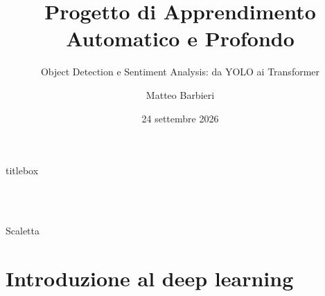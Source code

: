 \documentclass[aspectratio=169]{beamer}
\title[Progetto DL]{Progetto di Apprendimento Automatico e Profondo}
\subtitle{Object Detection e Sentiment Analysis: da YOLO ai Transformer}
\author{Matteo Barbieri}
\institute[Apprendimento Profondo]{Apprendimento Profondo}
\date{24 settembre 2026}
\begin{document}

\begin{frame}[plain]
  \vfill
  \begin{center}
    \begin{beamercolorbox}[rounded=true, shadow=true, wd=0.88\paperwidth,
                           sep=10pt, center]{titlebox}
      {\inserttitle}\\[4pt]
      {\normalsize\insertsubtitle}
    \end{beamercolorbox}
  \end{center}
  \vspace{0.9cm}
  \begin{center}
    {\insertauthor}\\[10pt]
    {\small\insertinstitute}\\[14pt]
    {\insertdate}
  \end{center}
  \vfill
\end{frame}

\begin{frame}{Scaletta}
  \tableofcontents
\end{frame}

\section{Introduzione al deep learning}
\end{document}

